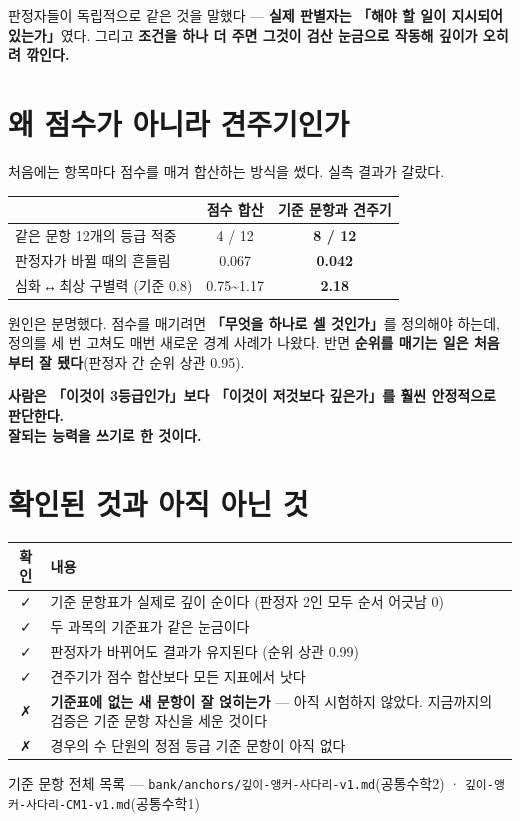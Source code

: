 \documentclass[11pt]{article}
\begin{document}
\vspace{2mm}
판정자들이 독립적으로 같은 것을 말했다 — \textbf{실제 판별자는 「해야 할 일이 지시되어 있는가」}였다.
그리고 \textbf{조건을 하나 더 주면 그것이 검산 눈금으로 작동해 깊이가 오히려 깎인다.}

\section{왜 점수가 아니라 견주기인가}

처음에는 항목마다 점수를 매겨 합산하는 방식을 썼다. 실측 결과가 갈랐다.

\begin{center}
\begin{tabular}{@{}lcc@{}}
\toprule
& \textbf{점수 합산} & \textbf{기준 문항과 견주기} \\
\midrule
같은 문항 12개의 등급 적중 & 4 / 12 & \textbf{8 / 12} \\
판정자가 바뀔 때의 흔들림 & 0.067 & \textbf{0.042} \\
심화\,↔\,최상 구별력 (기준 0.8) & 0.75\textasciitilde1.17 & \textbf{2.18} \\
\bottomrule
\end{tabular}
\end{center}

\vspace{2mm}
원인은 분명했다. 점수를 매기려면 \textbf{「무엇을 하나로 셀 것인가」}를 정의해야 하는데,
정의를 세 번 고쳐도 매번 새로운 경계 사례가 나왔다.
반면 \textbf{순위를 매기는 일은 처음부터 잘 됐다}(판정자 간 순위 상관 0.95).

\begin{center}
\colorbox{pale}{\parbox{0.92\textwidth}{\vspace{2mm}\centering
\textbf{사람은 「이것이 3등급인가」보다 「이것이 저것보다 깊은가」를 훨씬 안정적으로 판단한다.\\
잘되는 능력을 쓰기로 한 것이다.}\vspace{2mm}}}
\end{center}

\section{확인된 것과 아직 아닌 것}

\begin{center}
\begin{tabular}{@{}cp{100mm}@{}}
\toprule
\textbf{확인} & \textbf{내용} \\
\midrule
✓ & 기준 문항표가 실제로 깊이 순이다 (판정자 2인 모두 순서 어긋남 0) \\
✓ & 두 과목의 기준표가 같은 눈금이다 \\
✓ & 판정자가 바뀌어도 결과가 유지된다 (순위 상관 0.99) \\
✓ & 견주기가 점수 합산보다 모든 지표에서 낫다 \\
\midrule
✗ & \textbf{기준표에 없는 새 문항이 잘 얹히는가} — 아직 시험하지 않았다.
지금까지의 검증은 기준 문항 자신을 세운 것이다 \\
✗ & 경우의 수 단원의 정점 등급 기준 문항이 아직 없다 \\
\bottomrule
\end{tabular}
\end{center}

\vspace{3mm}
{\small\color{muted}
기준 문항 전체 목록 — \texttt{bank/anchors/깊이-앵커-사다리-v1.md}(공통수학2) ·
\texttt{깊이-앵커-사다리-CM1-v1.md}(공통수학1)}
\end{document}

